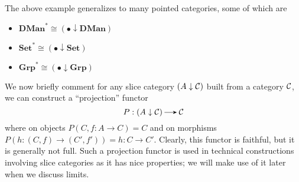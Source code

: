     The above example generalizes to many pointed categories, some of which are 
    \begin{itemize}
        \item $\textbf{DMan}^* \cong (\bullet \downarrow \textbf{DMan})$
        \item $\textbf{Set}^* \cong (\bullet \downarrow \textbf{Set})$
        \item $\textbf{Grp}^* \cong (\bullet \downarrow \textbf{Grp})$
    \end{itemize}

    We now briefly comment for any slice category $(A \downarrow \mathcal{C})$ 
    built from a category $\mathcal{C}$, we can construct a ``projection'' functor 
    \[
        P: (A \downarrow \cc) \to \cc  
    \]
    where on objects $P(C, f: A \to C) = C$ and on morphisms
    $P(h:(C, f) \to (C', f'))= h: C  \to C'$. Clearly, this functor is 
    faithful, but it is generally not full. Such a projection functor  
    is used in technical constructions involving slice categories as 
    it has nice properties; we will make use of it later when we discuss 
    limits. 

